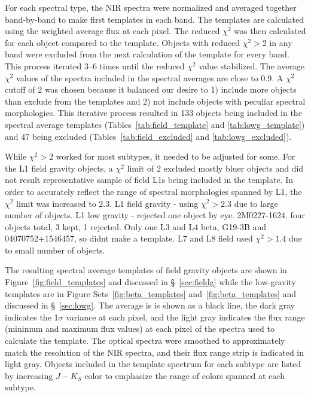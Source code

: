 \documentclass[12pt,preprint]{aastex}
\begin{document}
For each spectral type, the NIR spectra were normalized and averaged together band-by-band to make first templates in each band. 
The templates are calculated using the weighted average flux at each pixel. 
The reduced $\chi^2$ was then calculated for each object compared to the template.
Objects with reduced $\chi^2 > 2$ in any band were excluded from the next calculation of the template for every band.
This process iterated 3--6 times until the reduced $\chi^2$ value stabilized. 
The average $\chi^2$ values of the spectra included in the spectral averages are close to 0.9. 
A $\chi^2$ cutoff of 2 was chosen because it balanced our desire to 1) include more objects than exclude from the templates and 2) not include objects with peculiar spectral morphologies. 
This iterative process resulted in 133 objects being included in the spectral average templates (Tables~\ref{tab:field_template} and \ref{tab:lowg_template}) and 47 being excluded (Tables~\ref{tab:field_excluded} and \ref{tab:lowg_excluded}). 

While $\chi^2 > 2$ worked for most subtypes, it needed to be adjusted for some.
For the L1 field gravity objects, a $\chi^2$ limit of 2 excluded mostly bluer objects and did not result representative sample of field L1s being included in the template.
In order to accurately reflect the range of spectral morphologies spanned by L1, the $\chi^2$ limit was increased to 2.3.
L1 field gravity - using $\chi^2 > 2.3$ due to large number of objects.
L1 low gravity - rejected one object by eye. 2M0227-1624. four objects total, 3 kept, 1 rejected. 
Only one L3 and L4 beta, G19-3B and 04070752+1546457, so didnt make a template.
L7 and L8 field used $\chi^2 > 1.4$ due to small number of objects.


The resulting spectral average templates of field gravity objects are shown in Figure~\ref{fig:field_templates} and discussed in \S~\ref{sec:fieldg} while the low-gravity templates are in Figure Sets~\ref{fig:beta_templates} and~\ref{fig:beta_templates} and discussed in \S~\ref{sec:lowg}. 
The average is is shown as a black line, the dark gray indicates the 1$\sigma$ variance at each pixel, and the light gray indicates the flux range (minimum and maximum flux values) at each pixel of the spectra used to calculate the template. 
The optical spectra were smoothed to approximately match the resolution of the NIR spectra, and their flux range strip is indicated in light gray.
Objects included in the template spectrum for each subtype are listed by increasing $J-K_S$ color to emphasize the range of colors spanned at each subtype.
\end{document}
